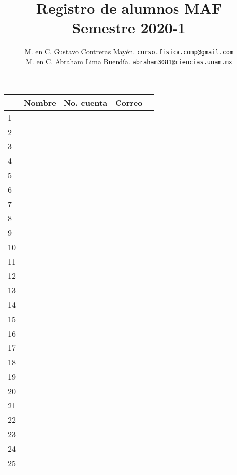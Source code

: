 \documentclass[12pt]{article}
\author{M. en C. Gustavo Contreras Mayén. \texttt{curso.fisica.comp@gmail.com}\\
M. en C. Abraham Lima Buendía. \texttt{abraham3081@ciencias.unam.mx}}
\title{Registro de alumnos MAF \\ {\large Semestre 2020-1}}
\date{ }
\begin{document}
\maketitle
\fontsize{14}{14}\selectfont
\hspace*{-2cm}
\begin{flushleft} 
\begin{tabular}{| l | >{\centering\arraybackslash}m{7cm}| >{\centering\arraybackslash}m{3.5cm}| >{\centering\arraybackslash}m{5cm} | c | } \hline
 & Nombre & No. cuenta & Correo \\
\hline 1 & & & \\
\hline 2 & & & \\
\hline 3 & & & \\
\hline 4 & & & \\
\hline 5 & & & \\
\hline 6 & & & \\
\hline 7 & & & \\
\hline 8 & & & \\
\hline 9 & & & \\
\hline 10 & & & \\
\hline 11 & & & \\
\hline 12 & & & \\
\hline 13 & & & \\
\hline 14 & & & \\
\hline 15 & & & \\
\hline 16 & & & \\
\hline 17 & & & \\
\hline 18 & & & \\
\hline 19 & & & \\
\hline 20 & & & \\
\hline 21 & & & \\
\hline 22 & & & \\
\hline 23 & & & \\
\hline 24 & & & \\
\hline 25 & & & \\ \hline
\end{tabular}
\end{flushleft}
\end{document}

